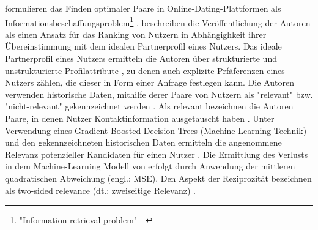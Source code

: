 \textcite[S. 66ff.]{diaz:inproceedings} formulieren das Finden optimaler Paare in Online-Dating-Plattformen als Informationsbeschaffungsproblem\footnote{"Information retrieval problem" - \textcite[S. 67]{diaz:inproceedings}} \cite[S. 550]{koprinska:inbook}.
\textcite[S. 550]{koprinska:inbook} beschreiben die Veröffentlichung der Autoren als einen Ansatz für das Ranking von Nutzern in Abhängighkeit ihrer Übereinstimmung mit dem idealen Partnerprofil eines Nutzers.
Das ideale Partnerprofil eines Nutzers ermitteln die Autoren über strukturierte und unstrukturierte Profilattribute \cite[S. 288]{li:article}\cite[S. 272]{pizzato:2:inproceedings}, zu denen auch explizite Prfäferenzen eines Nutzers zählen, die dieser in Form einer Anfrage festlegen kann.
Die Autoren verwenden historische Daten, mithilfe derer Paare von Nutzern als "relevant" bzw. "nicht-relevant" gekennzeichnet werden \cite[S. 288]{li:article}.
Als relevant bezeichnen die Autoren Paare, in denen Nutzer Kontaktinformation ausgetauscht haben \cite[S. 66ff.]{diaz:inproceedings}.
Unter Verwendung eines Gradient Boosted Decision Trees (Machine-Learning Technik) und den gekennzeichneten historischen Daten ermitteln \textcite[S. 69]{diaz:inproceedings} die angenommene Relevanz potenzieller Kandidaten für einen Nutzer \cite[S. 550]{koprinska:inbook}.
Die Ermittlung des Verlusts in dem Machine-Learning Modell von \textcite[S. 69]{diaz:inproceedings} erfolgt durch Anwendung der mittleren quadratischen Abweichung (engl.: \ac{MSE}).
Den Aspekt der Reziprozität bezeichnen \textcite[S. 66]{diaz:inproceedings} als two-sided relevance (dt.: zweiseitige Relevanz) \cite[S. 550]{koprinska:inbook}.

